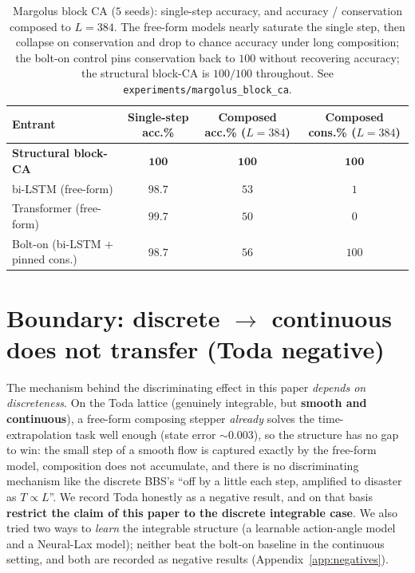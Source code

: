 \documentclass[11pt]{article}
\theoremstyle{definition}
\theoremstyle{plain}
\begin{document}
\begin{table}[h]
\centering
\caption{Margolus block CA ($5$ seeds): single-step accuracy, and accuracy / conservation composed to
$L=384$. The free-form models nearly saturate the single step, then collapse on conservation and drop
to chance accuracy under long composition; the bolt-on control pins conservation back to $100$ without
recovering accuracy; the structural block-CA is $100/100$ throughout. See
\texttt{experiments/margolus\_block\_ca}.}
\label{tab:margolus}
\begin{tabular}{lccc}
\toprule
\textbf{Entrant} & \textbf{Single-step acc.\%} & \textbf{Composed acc.\% ($L{=}384$)} & \textbf{Composed cons.\% ($L{=}384$)} \\
\midrule
\textbf{Structural block-CA} & $\mathbf{100}$ & $\mathbf{100}$ & $\mathbf{100}$ \\
bi-LSTM (free-form) & $98.7$ & $53$ & $1$ \\
Transformer (free-form) & $99.7$ & $50$ & $0$ \\
Bolt-on (bi-LSTM $+$ pinned cons.) & $98.7$ & $56$ & $100$ \\
\bottomrule
\end{tabular}
\end{table}

\section{Boundary: discrete $\to$ continuous does not transfer (Toda negative)}\label{sec:boundary}
The mechanism behind the discriminating effect in this paper \emph{depends on discreteness}. On the
Toda lattice (genuinely integrable, but \textbf{smooth and continuous}), a free-form composing stepper
\emph{already} solves the time-extrapolation task well enough (state error $\sim0.003$), so the
structure has no gap to win: the small step of a smooth flow is captured exactly by the free-form
model, composition does not accumulate, and there is no discriminating mechanism like the discrete
BBS's ``off by a little each step, amplified to disaster as $T\propto L$''. We record Toda honestly as
a negative result, and on that basis \textbf{restrict the claim of this paper to the discrete integrable
case}. We also tried two ways to \emph{learn} the integrable structure (a learnable action-angle model
and a Neural-Lax model); neither beat the bolt-on baseline in the continuous setting, and both are
recorded as negative results (Appendix~\ref{app:negatives}).
\end{document}

